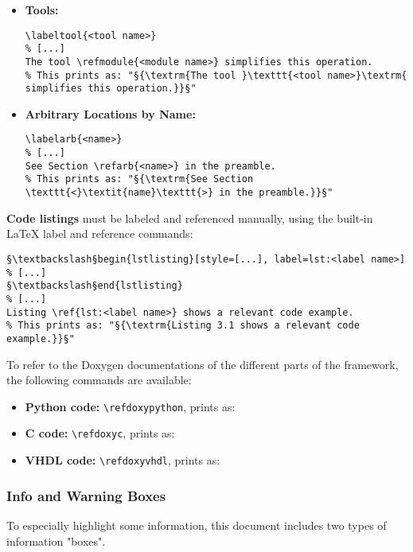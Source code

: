\begin{itemize}
\item \textbf{Tools:}
\begin{lstlisting}[style=LaTeXStyle]
\labeltool{<tool name>}
% [...]
The tool \refmodule{<module name>} simplifies this operation.
% This prints as: "§{\textrm{The tool }\texttt{<tool name>}\textrm{ simplifies this operation.}}§"
\end{lstlisting}

\item \textbf{Arbitrary Locations by Name:}
\begin{lstlisting}[style=LaTeXStyle]
\labelarb{<name>}
% [...]
See Section \refarb{<name>} in the preamble.
% This prints as: "§{\textrm{See Section \texttt{<}\textit{name}\texttt{>} in the preamble.}}§"
\end{lstlisting}

\end{itemize}

\textbf{Code listings} must be labeled and referenced manually, using the built-in \LaTeX{} label and reference commands:
\begin{lstlisting}[style=LaTeXStyle]
§\textbackslash§begin{lstlisting}[style=[...], label=lst:<label name>]
% [...]
§\textbackslash§end{lstlisting}
% [...]
Listing \ref{lst:<label name>} shows a relevant code example.
% This prints as: "§{\textrm{Listing 3.1 shows a relevant code example.}}§"
\end{lstlisting}

To refer to the Doxygen documentations of the different parts of the framework, the following commands are available:

\begin{itemize}
\item \textbf{Python code:} \lstinline[style=LaTeXStyle]{\refdoxypython}, prints as: 


\item \textbf{C code:} \lstinline[style=LaTeXStyle]{\refdoxyc}, prints as: 

\item \textbf{VHDL code:} \lstinline[style=LaTeXStyle]{\refdoxyvhdl}, prints as: 

\end{itemize}


\subsubsection{Info and Warning Boxes}

To especially highlight some information, this document includes two types of information "boxes".

